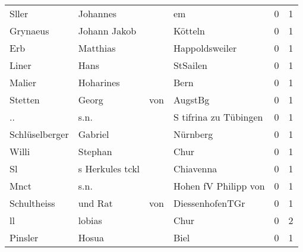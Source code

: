 \begin{tabular}{llllrr}
                    Sller &                           Johannes &             &                                          em &          0 &         1 \\
                 Grynaeus &                       Johann Jakob &             &                                     Kötteln &          0 &         1 \\
                      Erb &                           Matthias &             &                              Happoldsweiler &          0 &         1 \\
                    Liner &                               Hans &             &                                    StSailen &          0 &         1 \\
                   Malier &                          Hoharines &             &                                        Bern &          0 &         1 \\
                  Stetten &                              Georg &         von &                                     AugstBg &          0 &         1 \\
                       .. &                               s.n. &             &                       S tifrina zu Tübingen &          0 &         1 \\
           Schlüselberger &                            Gabriel &             &                                    Nürnberg &          0 &         1 \\
                    Willi &                            Stephan &             &                                        Chur &          0 &         1 \\
                       Sl &                    s Herkules tckl &             &                                   Chiavenna &          0 &         1 \\
                     Mnct &                               s.n. &             &                        Hohen fV Philipp von &          0 &         1 \\
              Schultheiss &                            und Rat &         von &                             DiessenhofenTGr &          0 &         1 \\
                       ll &                             lobias &             &                                        Chur &          0 &         2 \\
                  Pinsler &                              Hosua &             &                                        Biel &          0 &         1 \\

\end{tabular}
